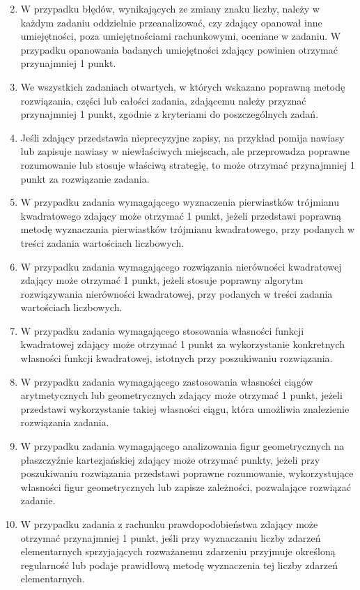 \documentclass[10pt]{article}
\begin{document}
\begin{enumerate}
  \setcounter{enumi}{1}
  \item W przypadku błędów, wynikających ze zmiany znaku liczby, należy w każdym zadaniu oddzielnie przeanalizować, czy zdający opanował inne umiejętności, poza umiejętnościami rachunkowymi, oceniane w zadaniu. W przypadku opanowania badanych umiejętności zdający powinien otrzymać przynajmniej 1 punkt.
  \item We wszystkich zadaniach otwartych, w których wskazano poprawną metodę rozwiązania, części lub całości zadania, zdającemu należy przyznać przynajmniej 1 punkt, zgodnie z kryteriami do poszczególnych zadań.
  \item Jeśli zdający przedstawia nieprecyzyjne zapisy, na przykład pomija nawiasy lub zapisuje nawiasy w niewłaściwych miejscach, ale przeprowadza poprawne rozumowanie lub stosuje właściwą strategię, to może otrzymać przynajmniej 1 punkt za rozwiązanie zadania.
  \item W przypadku zadania wymagającego wyznaczenia pierwiastków trójmianu kwadratowego zdający może otrzymać 1 punkt, jeżeli przedstawi poprawną metodę wyznaczania pierwiastków trójmianu kwadratowego, przy podanych w treści zadania wartościach liczbowych.
  \item W przypadku zadania wymagającego rozwiązania nierówności kwadratowej zdający może otrzymać 1 punkt, jeżeli stosuje poprawny algorytm rozwiązywania nierówności kwadratowej, przy podanych w treści zadania wartościach liczbowych.
  \item W przypadku zadania wymagającego stosowania własności funkcji kwadratowej zdający może otrzymać 1 punkt za wykorzystanie konkretnych własności funkcji kwadratowej, istotnych przy poszukiwaniu rozwiązania.
  \item W przypadku zadania wymagającego zastosowania własności ciągów arytmetycznych lub geometrycznych zdający może otrzymać 1 punkt, jeżeli przedstawi wykorzystanie takiej własności ciągu, która umożliwia znalezienie rozwiązania zadania.
  \item W przypadku zadania wymagającego analizowania figur geometrycznych na płaszczyźnie kartezjańskiej zdający może otrzymać punkty, jeżeli przy poszukiwaniu rozwiązania przedstawi poprawne rozumowanie, wykorzystujące własności figur geometrycznych lub zapisze zależności, pozwalające rozwiązać zadanie.
  \item W przypadku zadania z rachunku prawdopodobieństwa zdający może otrzymać przynajmniej 1 punkt, jeśli przy wyznaczaniu liczby zdarzeń elementarnych sprzyjających rozważanemu zdarzeniu przyjmuje określoną regularność lub podaje prawidłową metodę wyznaczenia tej liczby zdarzeń elementarnych.

\end{enumerate}
\end{document}
